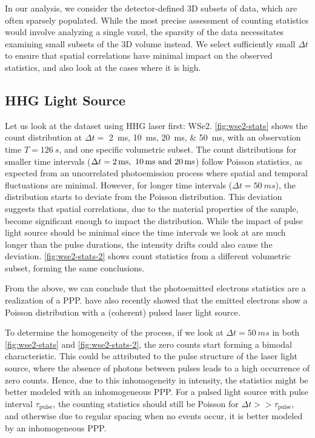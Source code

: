 In our analysis, we consider the detector-defined 3D subsets of data, which are often sparsely populated. While the most precise assessment of counting statistics would involve analyzing a single voxel, the sparsity of the data necessitates examining small subsets of the 3D volume instead. We select sufficiently small $\Delta t$ to ensure that spatial correlations have minimal impact on the observed statistics, and also look at the cases where it is high.

\subsection{HHG Light Source}
Let us look at the dataset using \gls{HHG} laser first: \gls{WSe2}. \cref{fig:wse2-stats} shows the count distribution at $\Delta t =$ \qtylist{2;10;20;50}{ms}, with an observation time $T=\qty{126}{s}$, and one specific volumetric subset. The count distributions for smaller time intervals ($\Delta t = \qtylist{2;10;20}{ms}$) follow Poisson statistics, as expected from an uncorrelated photoemission process where spatial and temporal fluctuations are minimal. However, for longer time intervals ($\Delta t = \qty{50}{ms}$), the distribution starts to deviate from the Poisson distribution. This deviation suggests that spatial correlations, due to the material properties of the sample, become significant enough to impact the distribution. While the impact of pulse light source should be minimal since the time intervals we look at are much longer than the pulse durations, the intensity drifts could also cause the deviation. \cref{fig:wse2-stats-2} shows count statistics from a different volumetric subset, forming the same conclusions.

From the above, we can conclude that the photoemitted electrons statistics are a realization of a \gls{PPP}. \citeauthor{heimerlMultiphotonElectronEmission2024} \cite{heimerlMultiphotonElectronEmission2024} have also recently showed that the emitted electrons show a Poisson distribution with a (coherent) pulsed laser light source.

To determine the homogeneity of the process, if we look at $\Delta t = \qty{50}{ms}$ in both \cref{fig:wse2-stats} and \cref{fig:wse2-stats-2}, the zero counts start forming a bimodal characteristic. This could be attributed to the pulse structure of the laser light source, where the absence of photons between pulses leads to a high occurrence of zero counts. Hence, due to this inhomogeneity in intensity, the  statistics might be better modeled with an inhomogeneous \gls{PPP}. For a pulsed light source with pulse interval $\tau_{\text{pulse}}$, the counting statistics should still be Poisson for $\Delta t >> \tau_{\text{pulse}}$, and otherwise due to regular spacing when no events occur, it is better modeled by an inhomogeneous \gls{PPP}.

